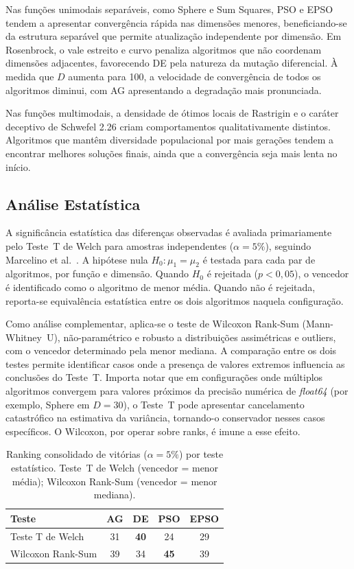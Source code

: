 \documentclass[runningheads]{llncs}
\begin{document}
Nas funções unimodais separáveis, como Sphere e Sum Squares, PSO e
EPSO tendem a apresentar convergência rápida nas dimensões menores,
beneficiando-se da estrutura separável que permite atualização
independente por dimensão. Em Rosenbrock, o vale estreito e curvo
penaliza algoritmos que não coordenam dimensões adjacentes, favorecendo
DE pela natureza da mutação diferencial. À medida que $D$ aumenta
para 100, a velocidade de convergência de todos os algoritmos diminui,
com AG apresentando a degradação mais pronunciada.

Nas funções multimodais, a densidade de ótimos locais de Rastrigin
e o caráter deceptivo de Schwefel 2.26 criam comportamentos
qualitativamente distintos. Algoritmos que mantêm diversidade
populacional por mais gerações tendem a encontrar melhores soluções
finais, ainda que a convergência seja mais lenta no início.

\subsection{An\'{a}lise Estat\'{i}stica}

A significância estatística das diferenças observadas é avaliada
primariamente pelo Teste~T de Welch para amostras independentes
($\alpha = 5\%$), seguindo Marcelino et al.~\cite{marcelino2018}.
A hipótese nula $H_0\!: \mu_1 = \mu_2$ é testada para cada par de
algoritmos, por função e dimensão. Quando $H_0$ é rejeitada
($p < 0{,}05$), o vencedor é identificado como o algoritmo de menor
média. Quando não é rejeitada, reporta-se equivalência estatística
entre os dois algoritmos naquela configuração.

Como análise complementar, aplica-se o teste de Wilcoxon
Rank-Sum (Mann-Whitney~U), não-paramétrico e robusto a distribuições
assimétricas e outliers, com o vencedor determinado pela menor
mediana. A comparação entre os dois testes permite identificar casos
onde a presença de valores extremos influencia as conclusões do
Teste~T\@. Importa notar que em configurações onde múltiplos
algoritmos convergem para valores próximos da precisão numérica de
\textit{float64} (por exemplo, Sphere em $D=30$), o Teste~T pode
apresentar cancelamento catastrófico na estimativa da variância,
tornando-o conservador nesses casos específicos. O Wilcoxon, por
operar sobre ranks, é imune a esse efeito.

\begin{table}[H]
\caption{Ranking consolidado de vitórias ($\alpha = 5\%$) por teste
estatístico. Teste~T de Welch (vencedor = menor média);
Wilcoxon Rank-Sum (vencedor = menor mediana).}
\label{tab:ranking_t}
\centering
\begin{tabular}{lcccc}
\toprule
\textbf{Teste} & \textbf{AG} & \textbf{DE} & \textbf{PSO} & \textbf{EPSO} \\
\midrule
Teste T de Welch  & 31 & \textbf{40} & 24 & 29 \\
Wilcoxon Rank-Sum & 39 & 34 & \textbf{45} & 39 \\
\bottomrule
\end{tabular}
\end{table}
\end{document}

